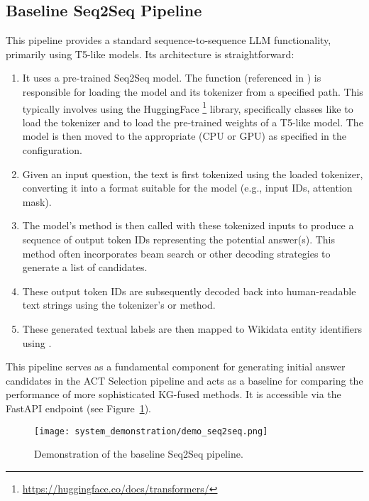 \subsection{Baseline Seq2Seq Pipeline}
\label{sec:system_demos:architecture:seq2seq}
This pipeline provides a standard sequence-to-sequence LLM functionality, primarily using T5-like models. Its architecture is straightforward:
\begin{enumerate}
    \item It uses a pre-trained Seq2Seq model. The  function (referenced in ) is responsible for loading the model and its tokenizer from a specified path. This typically involves using the HuggingFace \footnote{\url{https://huggingface.co/docs/transformers/}} library, specifically classes like  to load the tokenizer and  to load the pre-trained weights of a T5-like model. The model is then moved to the appropriate  (CPU or GPU) as specified in the configuration.
    \item Given an input question, the text is first tokenized using the loaded tokenizer, converting it into a format suitable for the model (e.g., input IDs, attention mask).
    \item The model's  method is then called with these tokenized inputs to produce a sequence of output token IDs representing the potential answer(s). This method often incorporates beam search or other decoding strategies to generate a list of candidates.
    \item These output token IDs are subsequently decoded back into human-readable text strings using the tokenizer's  or  method.
    \item These generated textual labels are then mapped to Wikidata entity identifiers using .
\end{enumerate}
This pipeline serves as a fundamental component for generating initial answer candidates in the ACT Selection pipeline and acts as a baseline for comparing the performance of more sophisticated KG-fused methods. It is accessible via the  FastAPI endpoint (see Figure~\ref{fig:demo_seq2seq}).

\begin{figure}[htb]
    \centering
    \texttt{[image: system\_demonstration/demo\_seq2seq.png]}
    \caption{Demonstration of the baseline Seq2Seq pipeline.}
    \label{fig:demo_seq2seq}
\end{figure}

